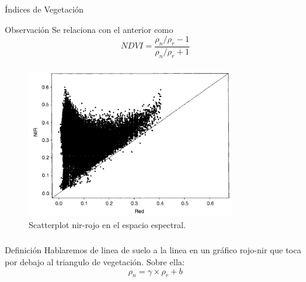 \documentclass[handout]{beamer}
\begin{document}
\begin{frame}{Índices de Vegetación}
  \begin{block}{Observación}
    Se relaciona con el anterior como $$NDVI = \frac{\rho_n/\rho_r-1}{\rho_n/\rho_r+1}$$
  \end{block}
\end{frame}

\begin{frame}
    \frametitle{\subsecname}
    \begin{figure}
    \begin{center}
        \includegraphics[width=0.8\textwidth]{imagenes/scatter82.png}
    \end{center}
        \caption{Scatterplot nir-rojo en el espacio espectral. }
    \end{figure}
\end{frame}

\begin{frame}
    \frametitle{\subsecname}
     \begin{block}{Definición}
        Hablaremos de linea de suelo a la linea en un gráfico rojo-nir que toca
        por debajo al triangulo de vegetación. Sobre ella:
         \begin{equation}
             \rho_n = \gamma \times \rho_r +b
         \end{equation}
     \end{block}
\end{frame}
\end{document}
